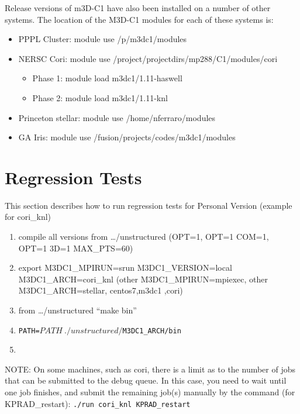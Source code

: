 Release versions of m3D-C1 have also been installed on a number of other systems.   The location of the M3D-C1 modules for each of these systems is:
\begin{itemize}
\item	PPPL Cluster:	module use /p/m3dc1/modules
\item	NERSC Cori:	module use /project/projectdirs/mp288/C1/modules/cori
\begin{itemize}
\item		Phase 1: module load m3dc1/1.11-haswell
\item		Phase 2: module load m3dc1/1.11-knl
\end{itemize}
\item	Princeton stellar:	module use /home/nferraro/modules
\item	GA Iris:		module use /fusion/projects/codes/m3dc1/modules
\end{itemize}
\section{Regression Tests}
This section describes how to run regression tests for Personal Version (example for cori\_knl)
\begin{enumerate}
\item compile all versions from …/unstructured  (OPT=1, OPT=1 COM=1, OPT=1 3D=1 MAX\_PTS=60)
\item export M3DC1\_MPIRUN=srun M3DC1\_VERSION=local M3DC1\_ARCH=cori\_knl
	(other M3DC1\_MPIRUN=mpiexec, other M3DC1\_ARCH=stellar, centos7,m3dc1 ,cori)
\item from …/unstructured  “make bin”
\item \texttt{PATH=$PATH\: ./unstructured/$M3DC1\_ARCH/bin}
\item 
{}
\end{enumerate}

NOTE:  On some machines, such as cori, there is a limit as to the number of jobs that can be submitted to the debug queue.   In this case, you need to wait until one job finishes, and submit the remaining job(s) manually by the command (for KPRAD\_restart):
\texttt{./run cori\_knl KPRAD\_restart}

